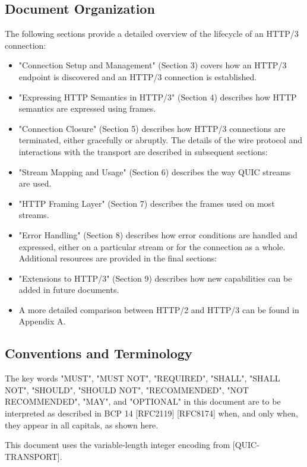 \documentclass{article}
\begin{document}
\subsection{Document Organization}

The following sections provide a detailed overview of the lifecycle of an HTTP/3 connection:

\begin{itemize}
\item "Connection Setup and Management" (Section 3) covers how an HTTP/3 endpoint is discovered and an HTTP/3 connection is established.
\item "Expressing HTTP Semantics in HTTP/3" (Section 4) describes how HTTP semantics are expressed using frames.
\item "Connection Closure" (Section 5) describes how HTTP/3 connections are terminated, either gracefully or abruptly.
The details of the wire protocol and interactions with the transport are described in subsequent sections:

\item "Stream Mapping and Usage" (Section 6) describes the way QUIC streams are used.
\item "HTTP Framing Layer" (Section 7) describes the frames used on most streams.
\item "Error Handling" (Section 8) describes how error conditions are handled and expressed, either on a particular stream or for the connection as a whole.
Additional resources are provided in the final sections:

\item "Extensions to HTTP/3" (Section 9) describes how new capabilities can be added in future documents.
\item A more detailed comparison between HTTP/2 and HTTP/3 can be found in Appendix A.
\end{itemize}
\subsection{Conventions and Terminology}

The key words "MUST", "MUST NOT", "REQUIRED", "SHALL", "SHALL NOT", "SHOULD", "SHOULD NOT", "RECOMMENDED", "NOT RECOMMENDED", "MAY", and "OPTIONAL" in this document are to be interpreted as described in BCP 14 [RFC2119] [RFC8174] when, and only when, they appear in all capitals, as shown here.

This document uses the variable-length integer encoding from [QUIC-TRANSPORT].
\end{document}
